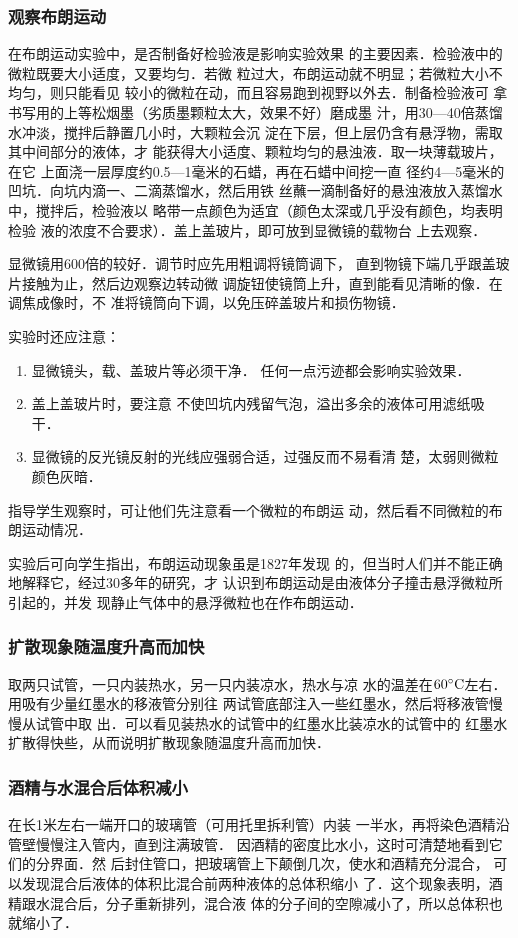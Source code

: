 \subsubsection{观察布朗运动}
在布朗运动实验中，是否制备好检验液是影响实验效果
的主要因素．检验液中的微粒既要大小适度，又要均匀．若微
粒过大，布朗运动就不明显；若微粒大小不均匀，则只能看见
较小的微粒在动，而且容易跑到视野以外去．制备检验液可
拿书写用的上等松烟墨（劣质墨颗粒太大，效果不好）磨成墨
汁，用30—40倍蒸馏水冲淡，搅拌后静置几小时，大颗粒会沉
淀在下层，但上层仍含有悬浮物，需取其中间部分的液体，才
能获得大小适度、颗粒均匀的悬浊液．取一块薄载玻片，在它
上面浇一层厚度约0.5—1毫米的石蜡，再在石蜡中间挖一直
径约4—5毫米的凹坑．向坑内滴一、二滴蒸馏水，然后用铁
丝蘸一滴制备好的悬浊液放入蒸馏水中，搅拌后，检验液以
略带一点颜色为适宜（颜色太深或几乎没有颜色，均表明检验
液的浓度不合要求）．盖上盖玻片，即可放到显微镜的载物台
上去观察．

显微镜用600倍的较好．调节时应先用粗调将镜筒调下，
直到物镜下端几乎跟盖玻片接触为止，然后边观察边转动微
调旋钮使镜筒上升，直到能看见清晰的像．在调焦成像时，不
准将镜筒向下调，以免压碎盖玻片和损伤物镜．

实验时还应注意：
\begin{enumerate}
\item 显微镜头，载、盖玻片等必须干净．
任何一点污迹都会影响实验效果．
\item 盖上盖玻片时，要注意
不使凹坑内残留气泡，溢出多余的液体可用滤纸吸干．
\item 
显微镜的反光镜反射的光线应强弱合适，过强反而不易看清
楚，太弱则微粒颜色灰暗．
\end{enumerate}

指导学生观察时，可让他们先注意看一个微粒的布朗运
动，然后看不同微粒的布朗运动情况．

实验后可向学生指出，布朗运动现象虽是1827年发现
的，但当时人们并不能正确地解释它，经过30多年的研究，才
认识到布朗运动是由液体分子撞击悬浮微粒所引起的，并发
现静止气体中的悬浮微粒也在作布朗运动．

\subsubsection{扩散现象随温度升高而加快}
取两只试管，一只内装热水，另一只内装凉水，热水与凉
水的温差在$60^{\circ}{\rm C}$左右．用吸有少量红墨水的移液管分别往
两试管底部注入一些红墨水，然后将移液管慢慢从试管中取
出．可以看见装热水的试管中的红墨水比装凉水的试管中的
红墨水扩散得快些，从而说明扩散现象随温度升高而加快．

\subsubsection{酒精与水混合后体积减小}
在长1米左右一端开口的玻璃管（可用托里拆利管）内装
一半水，再将染色酒精沿管壁慢慢注入管内，直到注满玻管．
因酒精的密度比水小，这时可清楚地看到它们的分界面．然
后封住管口，把玻璃管上下颠倒几次，使水和酒精充分混合，
可以发现混合后液体的体积比混合前两种液体的总体积缩小
了．这个现象表明，酒精跟水混合后，分子重新排列，混合液
体的分子间的空隙减小了，所以总体积也就缩小了．

